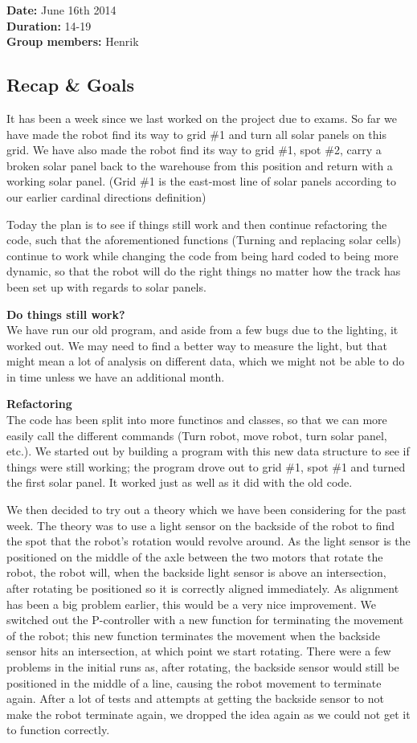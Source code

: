 \textbf{Date:} June 16th 2014\\\textbf{Duration:} 14-19\\\textbf{Group
members:} Henrik

\subsection{Recap \& Goals}

It has been a week since we last worked on the project due to exams. So
far we have made the robot find its way to grid \#1 and turn all solar
panels on this grid. We have also made the robot find its way to grid
\#1, spot \#2, carry a broken solar panel back to the warehouse from
this position and return with a working solar panel. (Grid \#1 is the
east-most line of solar panels according to our earlier cardinal
directions definition)

Today the plan is to see if things still work and then continue
refactoring the code, such that the aforementioned functions (Turning
and replacing solar cells) continue to work while changing the code from
being hard coded to being more dynamic, so that the robot will do the
right things no matter how the track has been set up with regards to
solar panels.

\textbf{Do things still work?}\\We have run our old program, and aside
from a few bugs due to the lighting, it worked out. We may need to find
a better way to measure the light, but that might mean a lot of analysis
on different data, which we might not be able to do in time unless we
have an additional month.

\textbf{Refactoring}\\The code has been split into more functinos and
classes, so that we can more easily call the different commands (Turn
robot, move robot, turn solar panel, etc.). We started out by building a
program with this new data structure to see if things were still
working; the program drove out to grid \#1, spot \#1 and turned the
first solar panel. It worked just as well as it did with the old code.

We then decided to try out a theory which we have been considering for
the past week. The theory was to use a light sensor on the backside of
the robot to find the spot that the robot's rotation would revolve
around. As the light sensor is the positioned on the middle of the axle
between the two motors that rotate the robot, the robot will, when the
backside light sensor is above an intersection, after rotating be
positioned so it is correctly aligned immediately. As alignment has been
a big problem earlier, this would be a very nice improvement. We
switched out the P-controller with a new function for terminating the
movement of the robot; this new function terminates the movement when
the backside sensor hits an intersection, at which point we start
rotating. There were a few problems in the initial runs as, after
rotating, the backside sensor would still be positioned in the middle of
a line, causing the robot movement to terminate again. After a lot of
tests and attempts at getting the backside sensor to not make the robot
terminate again, we dropped the idea again as we could not get it to
function correctly.

